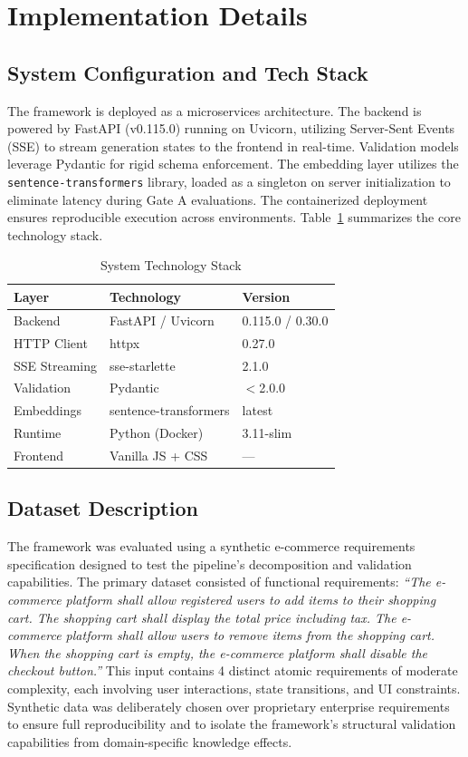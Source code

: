\documentclass[journal]{IEEEtran}
\begin{document}
\section{Implementation Details}

\subsection{System Configuration and Tech Stack}
The framework is deployed as a microservices architecture. The backend is powered by FastAPI (v0.115.0) running on Uvicorn, utilizing Server-Sent Events (SSE) to stream generation states to the frontend in real-time. Validation models leverage Pydantic for rigid schema enforcement. The embedding layer utilizes the \texttt{sentence-transformers} library, loaded as a singleton on server initialization to eliminate latency during Gate A evaluations. The containerized deployment ensures reproducible execution across environments. Table~\ref{tab:techstack} summarizes the core technology stack.

\begin{table}[ht]
\centering
\caption{System Technology Stack}
\label{tab:techstack}
\begin{tabular}{@{}lll@{}}
\toprule
\textbf{Layer} & \textbf{Technology} & \textbf{Version} \\ \midrule
Backend & FastAPI / Uvicorn & 0.115.0 / 0.30.0 \\
HTTP Client & httpx & 0.27.0 \\
SSE Streaming & sse-starlette & 2.1.0 \\
Validation & Pydantic & $<$2.0.0 \\
Embeddings & sentence-transformers & latest \\
Runtime & Python (Docker) & 3.11-slim \\
Frontend & Vanilla JS + CSS & --- \\
\bottomrule
\end{tabular}
\end{table}

\subsection{Dataset Description}
The framework was evaluated using a synthetic e-commerce requirements specification designed to test the pipeline's decomposition and validation capabilities. The primary dataset consisted of functional requirements: \textit{``The e-commerce platform shall allow registered users to add items to their shopping cart. The shopping cart shall display the total price including tax. The e-commerce platform shall allow users to remove items from the shopping cart. When the shopping cart is empty, the e-commerce platform shall disable the checkout button.''} This input contains 4 distinct atomic requirements of moderate complexity, each involving user interactions, state transitions, and UI constraints. Synthetic data was deliberately chosen over proprietary enterprise requirements to ensure full reproducibility and to isolate the framework's structural validation capabilities from domain-specific knowledge effects.
\end{document}
